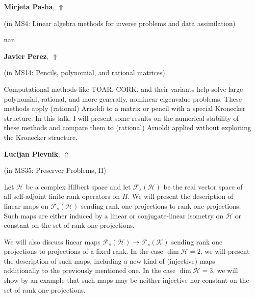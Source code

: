 \documentclass[ILAS2025-program.tex]{subfiles}
\begin{document}
     \hypertarget{down0312}{}\begin{ilasabstract}
    
    \textbf{Mirjeta Pasha},  \hfill \hyperlink{up0312}{$\Uparrow$}
    
    (in {\color{mstitle}MS4: Linear algebra methods for inverse problems and data assimilation})
        
        \mtskip
    nan\end{ilasabstract}
     \hypertarget{down0328}{}\begin{ilasabstract}
    
    \textbf{Javier Perez},  \hfill \hyperlink{up0328}{$\Uparrow$}
    
    (in {\color{mstitle}MS14: Pencils, polynomial, and rational matrices})
        
        \mtskip
    Computational methods like TOAR, CORK, and their variants help solve large polynomial, rational, and more generally, nonlinear eigenvalue problems. 
These methods apply (rational) Arnoldi to a matrix or pencil with a special Kronecker structure.
In this talk, I will present some results on the numerical stability of these methods and compare them to  (rational) Arnoldi applied without exploiting the Kronecker structure.\end{ilasabstract}
     \hypertarget{down0280}{}\begin{ilasabstract}
    
    \textbf{Lucijan Plevnik},  \hfill \hyperlink{up0280}{$\Uparrow$}
    
    (in {\color{mstitle}MS35: Preserver Problems, II})
        
        \mtskip
    Let $\mathcal H$ be a complex Hilbert space and let ${\mathcal F}_{s}(\mathcal H)$ be the real vector space of all self-adjoint finite rank operators on $H$.
We will present the description of linear maps on ${\mathcal F}_{s}(\mathcal H)$ sending rank one projections to rank one projections.
Such maps are either induced by a linear or conjugate-linear isometry on $\mathcal H$ or constant on the set of rank one projections.

We will also discuss linear maps ${\mathcal F}_{s}(\mathcal H) \to {\mathcal F}_{s}(\mathcal K)$ sending rank one projections to projections of a fixed rank.
In the case $\dim \mathcal H = 2$, we will present the description of such maps, including a new kind of (injective) maps additionally to the previously mentioned one.
In the case $\dim \mathcal H = 3$, we will show by an example that such maps may be neither injective nor constant on the set of rank one projections.
\end{ilasabstract}
\end{document}
